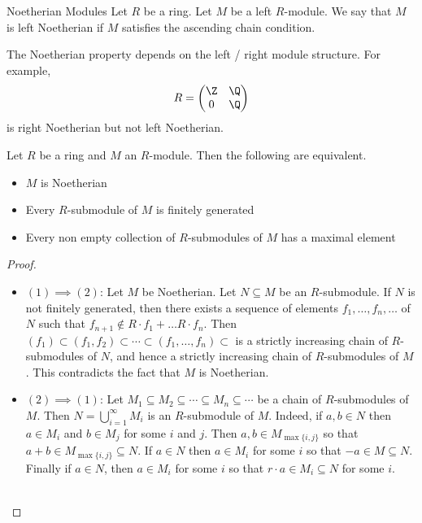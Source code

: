 \documentclass[a4paper]{article}
\begin{document}
\begin{defn}{Noetherian Modules}{} Let $R$ be a ring. Let $M$ be a left $R$-module. We say that $M$ is left Noetherian if $M$ satisfies the ascending chain condition. 
\end{defn}

The Noetherian property depends on the left / right module structure. For example, $$R=\begin{pmatrix}
\Z & \Q\\
0 & \Q
\end{pmatrix}$$ is right Noetherian but not left Noetherian. 

\begin{prp}{}{} Let $R$ be a ring and $M$ an $R$-module. Then the following are equivalent. 
\begin{itemize}
\item $M$ is Noetherian
\item Every $R$-submodule of $M$ is finitely generated
\item Every non empty collection of $R$-submodules of $M$ has a maximal element
\end{itemize} \tcbline
\begin{proof}~\\
\begin{itemize}
\item $(1)\implies(2)$: Let $M$ be Noetherian. Let $N\subseteq M$ be an $R$-submodule. If $N$ is not finitely generated, then there exists a sequence of elements $f_1,\dots,f_n,\dots$ of $N$ such that $f_{n+1}\notin R\cdot f_1+\dots R\cdot f_n$. Then $(f_1)\subset (f_1,f_2)\subset\cdots\subset(f_1,\dots,f_n)\subset$ is a strictly increasing chain of $R$-submodules of $N$, and hence a strictly increasing chain of $R$-submodules of $M$. This contradicts the fact that $M$ is Noetherian. 
\item $(2)\implies(1)$: Let $M_1\subseteq M_2\subseteq\cdots\subseteq M_n\subseteq\cdots$ be a chain of $R$-submodules of $M$. Then $N=\bigcup_{i=1}^\infty M_i$ is an $R$-submodule of $M$. Indeed, if $a,b\in N$ then $a\in M_i$ and $b\in M_j$ for some $i$ and $j$. Then $a,b\in M_{\max\{i,j\}}$ so that $a+b\in M_{\max\{i,j\}}\subseteq N$. If $a\in N$ then $a\in M_i$ for some $i$ so that $-a\in M\subseteq N$. Finally if $a\in N$, then $a\in M_i$ for some $i$ so that $r\cdot a\in M_i\subseteq N$ for some $i$. \\~\\


\end{itemize}
\end{proof}
\end{prp}
\end{document}
